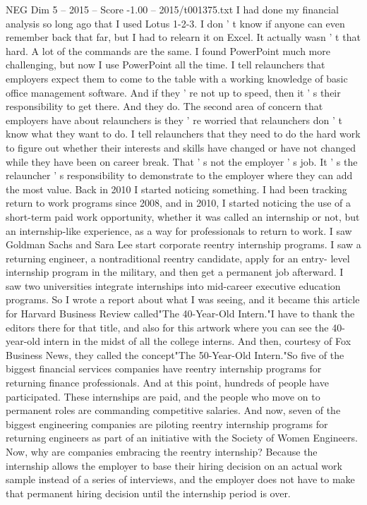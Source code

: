 \begin{textsample}{NEG Dim 5 – 2015 – Score -1.00 – 2015/t001375.txt}
I had done my financial analysis so long ago that I used Lotus 1-2-3.
I don ' t know if anyone can even remember back that far, but I had to relearn it on Excel.
It actually wasn ' t that hard.
A lot of the commands are the same.
I found PowerPoint much more challenging, but now I use PowerPoint all the time.
I tell relaunchers that employers expect them to come to the table with a working knowledge of basic office management software.
And if they ' re not up to speed, then it ' s their responsibility to get there.
And they do.
The second area of concern that employers have about relaunchers is they ' re worried that relaunchers don ' t know what they want to do.
I tell relaunchers that they need to do the hard work to figure out whether their interests and skills have changed or have not changed while they have been on career break.
That ' s not the employer ' s job.
It ' s the relauncher ' s responsibility to demonstrate to the employer where they can add the most value.
Back in 2010 I started noticing something.
I had been tracking return to work programs since 2008, and in 2010, I started noticing the use of a short-term paid work opportunity, whether it was called an internship or not, but an internship-like experience, as a way for professionals to return to work.
I saw Goldman Sachs and Sara Lee start corporate reentry internship programs.
I saw a returning engineer, a nontraditional reentry candidate, apply for an entry- level internship program in the military, and then get a permanent job afterward.
I saw two universities integrate internships into mid-career executive education programs.
So I wrote a report about what I was seeing, and it became this article for Harvard Business Review called"The 40-Year-Old Intern."I have to thank the editors there for that title, and also for this artwork where you can see the 40-year-old intern in the midst of all the college interns.
And then, courtesy of Fox Business News, they called the concept"The 50-Year-Old Intern."So five of the biggest financial services companies have reentry internship programs for returning finance professionals.
And at this point, hundreds of people have participated.
These internships are paid, and the people who move on to permanent roles are commanding competitive salaries.
And now, seven of the biggest engineering companies are piloting reentry internship programs for returning engineers as part of an initiative with the Society of Women Engineers.
Now, why are companies embracing the reentry internship?
Because the internship allows the employer to base their hiring decision on an actual work sample instead of a series of interviews, and the employer does not have to make that permanent hiring decision until the internship period is over.

\end{textsample}
